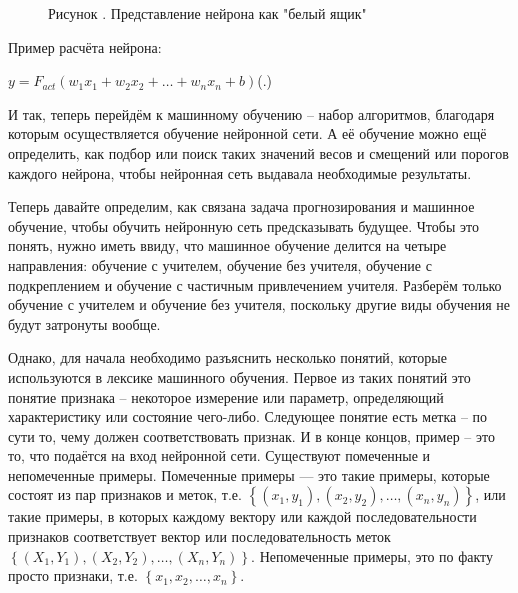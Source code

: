 {	\begin{figure}[H]
		\centering
		\def\svgwidth{\textwidth}
		
		\caption*{\gostFont Рисунок \thechaptercntr .\theimagecntr \spc {--} Представление нейрона как "белый ящик"}
		\label{fig:Neuron}
	\end{figure} \addtocounter{imagecntr}{1}
	
	\par \redline Пример расчёта нейрона:
	
		\formulaspace \par \redline 
	$y = F_{act}\left(w_1x_1 + w_2x_2 + \dots + w_nx_n + b\right)$\hfill (\thechaptercntr .\theformulacntr) \redline
	\formulaspace \addtocounter{formulacntr}{1}
	
	\par \redline И так, теперь перейдём к машинному обучению {--} набор алгоритмов, благодаря которым осуществляется обучение нейронной сети. А её обучение можно ещё определить, как подбор или поиск таких значений весов и смещений или порогов каждого нейрона, чтобы нейронная сеть выдавала необходимые результаты. 
	
	\par \redline Теперь давайте определим, как связана задача прогнозирования и машинное обучение, чтобы обучить нейронную сеть предсказывать будущее. Чтобы это понять, нужно иметь ввиду, что машинное обучение делится на четыре направления: обучение с учителем, обучение без учителя, обучение с подкреплением и обучение с частичным привлечением учителя. Разберём только обучение с учителем и обучение без учителя, поскольку другие виды обучения не будут затронуты вообще. 
	
	\par \redline Однако, для начала необходимо разъяснить несколько понятий, которые используются в лексике машинного обучения. Первое из таких понятий это понятие признака {--} некоторое измерение или параметр, определяющий характеристику или состояние чего-либо. Следующее понятие есть метка {--} по сути то, чему должен соответствовать признак.  И в конце концов, пример {--} это то, что подаётся на вход нейронной сети. Существуют помеченные и непомеченные примеры. Помеченные примеры — это такие примеры, которые состоят из пар признаков и меток, т.е. $\left\{\left(x_{1}, y_{1}\right), \left(x_{2}, y_{2}\right), \dots, \left(x_{n}, y_{n}\right)\right\}$, или такие примеры, в которых каждому вектору или каждой последовательности признаков соответствует вектор или последовательность меток $\left\{\left(X_{1}, Y_{1}\right), \left(X_{2}, Y_{2}\right), \dots, \left(X_{n}, Y_{n}\right)\right\}$. Непомеченные примеры, это по факту просто признаки, т.е. $\left\{x_{1}, x_{2}, \dots, x_{n}\right\}$. 
	
}
